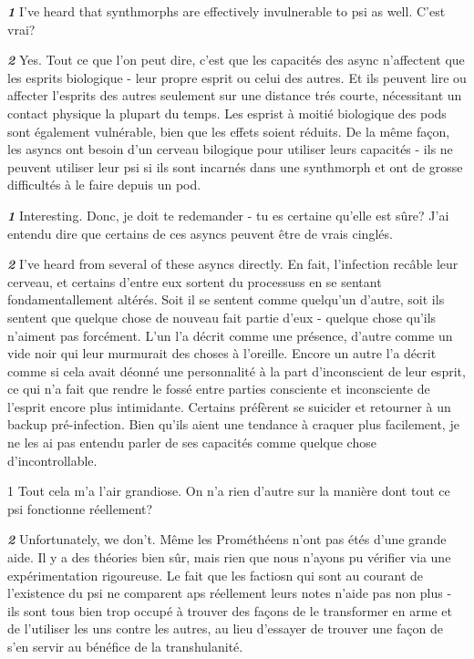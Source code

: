 \textbf{\textit{1}} I’ve heard that synthmorphs are effectively invulnerable to psi as well. C'est vrai? 

\textbf{\textit{2}} Yes. Tout ce que l'on peut dire, c'est que les capacités des async n'affectent que les esprits biologique - leur propre esprit ou celui des autres. Et ils peuvent lire ou affecter l'esprits des autres seulement sur une distance trés courte, nécessitant un contact physique la plupart du temps. Les esprist à moitié biologique des pods sont également vulnérable, bien que les effets soient réduits. De la même façon, les asyncs ont besoin d'un cerveau bilogique pour utiliser leurs capacités - ils ne peuvent utiliser leur psi si ils sont incarnés dans une synthmorph et ont de grosse difficultés à le faire depuis un pod. 

\textbf{\textit{1}} Interesting. Donc, je doit te redemander - tu es certaine qu'elle est sûre? J'ai entendu dire que certains de ces asyncs peuvent être de vrais cinglés. 

\textbf{\textit{2}} I’ve heard from several of these asyncs directly. En fait, l'infection recâble leur cerveau, et certains d'entre eux sortent du processuss en se sentant fondamentallement altérés. Soit il se sentent comme quelqu'un d'autre, soit ils sentent que quelque chose de nouveau fait partie d'eux - quelque chose qu'ils n'aiment pas forcément. L'un l'a décrit comme une présence, d'autre comme un vide noir qui leur murmurait des choses à l'oreille. Encore un autre l'a décrit comme si cela avait déonné une personnalité à la part d'inconscient de leur esprit, ce qui n'a fait que rendre le fossé entre parties consciente et inconsciente de l'esprit encore plus intimidante. Certains préfèrent se suicider et retourner à un backup pré-infection. Bien qu'ils aient une tendance à craquer plus facilement, je ne les ai pas entendu parler de ses capacités comme quelque chose d'incontrollable. 

1 Tout cela m'a l'air grandiose. On n'a rien d'autre sur la manière dont tout ce psi fonctionne réellement? 

\textbf{\textit{2}} Unfortunately, we don’t. Même les Prométhéens n'ont pas étés d'une grande aide. Il y a des théories bien sûr, mais rien que nous n'ayons pu vérifier via une expérimentation rigoureuse. Le fait que les factiosn qui sont au courant de l'existence du psi ne comparent aps réellement leurs notes n'aide pas non plus - ils sont tous bien trop occupé à trouver des façons de le transformer en arme et de l'utiliser les uns contre les autres, au lieu d'essayer de trouver une façon de s'en servir au bénéfice de la transhulanité. 

